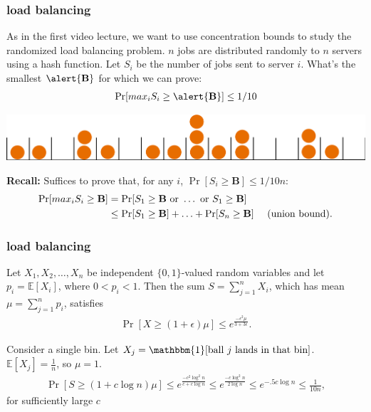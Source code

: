 \documentclass[handout,compress]{beamer}
\newcommand{\E}{\mathbb{E}}
\begin{document}
\begin{frame}
	\frametitle{load balancing}
	\small
	As in the first video lecture, we want to use concentration bounds to study the randomized load balancing problem. $n$ jobs are distributed randomly to $n$ servers using a hash function. Let $S_i$ be the number of jobs sent to server $i$.  What's the smallest $\alert{\mathbf{B}}$ for which we can prove:
	\begin{align*}
		\Pr[max_i S_i \geq \alert{\mathbf{B}}] \leq 1/10
	\end{align*}
	\vspace{-1em}
	\begin{center}
		\includegraphics[width=.6\textwidth]{ballsinbins.png}
	\end{center}
	
		\textbf{Recall:} Suffices to prove that, for any $i$, $\Pr[ S_i \geq {\mathbf{B}}] \leq 1/10n$:
		\begin{align*}
			\Pr[max_i S_i \geq {\mathbf{B}}] &= \Pr[S_1 \geq {\mathbf{B}} \text{ or } \ldots \text{ or } S_1 \geq {\mathbf{B}}] \\
			&\leq \Pr[S_1 \geq {\mathbf{B}}] + \ldots + \Pr[S_n \geq {\mathbf{B}}] \text{\hspace{1em} (union bound)}.
		\end{align*}
\end{frame}

\begin{frame}[t]
	\frametitle{load balancing}
	\begin{theorem}
		Let $X_1,X_2,\ldots,X_n$ be independent $\{0,1\}$-valued random variables and let
		$p_i = \E[X_i]$, where $0<p_i<1$.
		Then the sum $S = \sum_{j=1}^{n} X_i$, which has mean
		$\mu = \sum_{j=1}^{n} p_i$, satisfies
		\begin{align*}
			\Pr[X \geq (1+\epsilon)\mu] \leq e^{\frac{-\epsilon^2\mu}{3 + 3\epsilon}}.
		\end{align*}
	\end{theorem} 
	Consider a single bin. Let $X_j = \mathbbm{1}[\text{ball $j$ lands in that bin}]$. $\E[X_j] = \frac{1}{n}$, so $\mu = 1$. 
	\begin{align*}
		\Pr[S \geq (1+c\log n)\mu] \leq e^{\frac{-c^2\log^2 n}{c + c\log n}} \leq e^{\frac{-c\log^2 n}{2\log n}} \leq e^{-.5c\log n} \leq \frac{1}{10n},
	\end{align*}
	for sufficiently large $c$

\end{frame}
\end{document}
